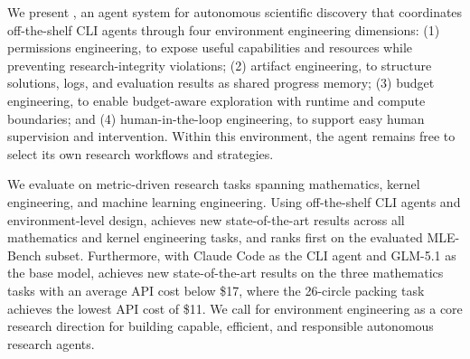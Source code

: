 \documentclass{article} %
\begin{document}
   We present \method, an agent system for autonomous scientific discovery that coordinates off-the-shelf CLI agents through four environment engineering dimensions: (1) permissions engineering, to expose useful capabilities and resources while preventing research-integrity violations; (2) artifact engineering, to structure solutions, logs, and evaluation results as shared progress memory; (3) budget engineering, to enable budget-aware exploration with runtime and compute boundaries; and (4) human-in-the-loop engineering, to support easy human supervision and intervention.
   Within this environment, the agent remains free to select its own research workflows and strategies. 
   
   We evaluate \method on metric-driven research tasks spanning mathematics, kernel engineering, and machine learning engineering. 
   Using off-the-shelf CLI agents and environment-level design, \method achieves new state-of-the-art results across all mathematics and kernel engineering tasks, and ranks first on the evaluated MLE-Bench subset.
   Furthermore, with Claude Code as the CLI agent and GLM-5.1 as the base model, \method achieves new state-of-the-art results on the three mathematics tasks with an average API cost below \$17, where the 26-circle packing task achieves the lowest API cost of \$11. 
   We call for environment engineering as a core research direction for building capable, efficient, and responsible autonomous research agents.
\end{document}
